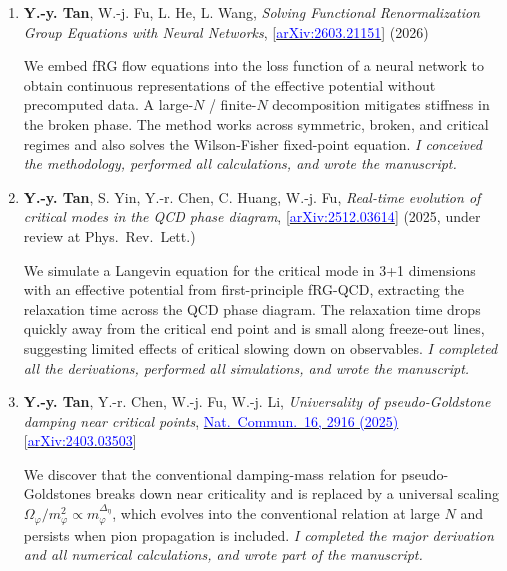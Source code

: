 \documentclass[11pt,a4paper]{article}
\begin{document}
\begin{enumerate}[leftmargin=*, label=\textbf{\arabic*.}, itemsep=6pt]

\item \textbf{Y.-y. Tan}, W.-j. Fu, L. He, L. Wang, \textit{Solving Functional Renormalization Group Equations with Neural Networks}, [\href{https://arxiv.org/abs/2603.21151}{\textcolor{blue}{arXiv:2603.21151}}] (2026)

We embed fRG flow equations into the loss function of a neural network to obtain continuous representations of the effective potential without precomputed data. A large-$N$ / finite-$N$ decomposition mitigates stiffness in the broken phase. The method works across symmetric, broken, and critical regimes and also solves the Wilson-Fisher fixed-point equation. \textit{I conceived the methodology,  performed all calculations, and wrote the manuscript.}

\item \textbf{Y.-y. Tan}, S. Yin, Y.-r. Chen, C. Huang, W.-j. Fu, \textit{Real-time evolution of critical modes in the QCD phase diagram}, [\href{https://arxiv.org/abs/2512.03614}{\textcolor{blue}{arXiv:2512.03614}}] (2025, under review at Phys.\ Rev.\ Lett.)

We simulate a Langevin equation for the critical mode in 3+1 dimensions with an effective potential from first-principle fRG-QCD, extracting the relaxation time across the QCD phase diagram. The relaxation time drops quickly away from the critical end point and is small along freeze-out lines, suggesting limited effects of critical slowing down on observables. \textit{I completed all the derivations, performed all simulations, and wrote the manuscript.}

\item \textbf{Y.-y. Tan}, Y.-r. Chen, W.-j. Fu, W.-j. Li, \textit{Universality of pseudo-Goldstone damping near critical points}, \href{https://doi.org/10.1038/s41467-025-58170-1}{\textcolor{blue}{Nat.~Commun.~16, 2916 (2025)}} [\href{https://arxiv.org/abs/2403.03503}{\textcolor{blue}{arXiv:2403.03503}}]

We discover that the conventional damping-mass relation for pseudo-Goldstones breaks down near criticality and is replaced by a universal scaling $\Omega_\varphi / m_\varphi^2 \propto m_\varphi^{\Delta_\eta}$, which evolves into the conventional relation at large $N$ and persists when pion propagation is included. \textit{I completed the major derivation and all numerical calculations, and wrote part of the manuscript.}


\end{enumerate}
\end{document}
